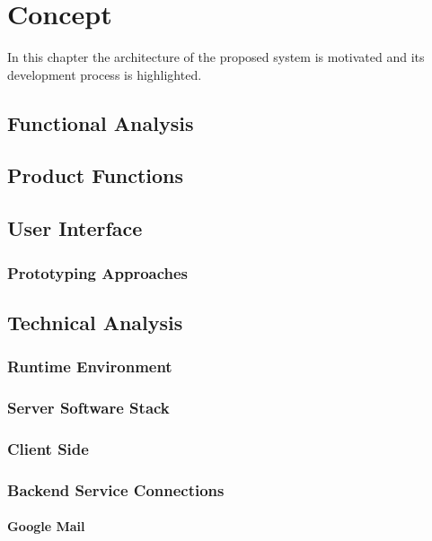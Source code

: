 \chapter{Concept}
\label{chapter:Concept}

In this chapter the architecture of the proposed system is motivated and its development process is highlighted.

\section{Functional Analysis}
\label{section:FunctionalAnalysis}

\section{Product Functions}

\section{User Interface}

\subsection{Prototyping Approaches}

\section{Technical Analysis}

\subsection{Runtime Environment}

\subsection{Server Software Stack}

\subsection{Client Side}

\subsection{Backend Service Connections}

\subsubsection{Google Mail}

